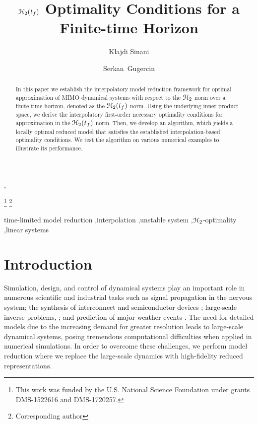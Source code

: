 \documentclass[twocolumn]{autart}
\begin{document}
\begin{frontmatter}
\title{ {$\EuScript{H}_2(t_f)$ Optimality Conditions for a Finite-time Horizon} }
\author{Klajdi Sinani} ,
\author{Serkan~Gugercin} 

\thanks[mytitlenote]{This work was funded by the U.S. National Science Foundation under grants DMS-1522616 and  DMS-1720257.}
\thanks[cor]{Corresponding author }
\address{Department of Mathematics, Virginia Polytechnic Institute and State University, Blacksburg, VA 24061, USA}

\begin{abstract} 
In this paper we establish the interpolatory model reduction framework for optimal approximation of MIMO dynamical systems with respect to the $\EuScript{H}_2$ norm over a finite-time horizon, denoted as the $\EuScript{H}_2(t_f)$ norm.
Using the underlying inner product space, we derive the interpolatory first-order necessary optimality conditions for approximation in the $\EuScript{H}_2(t_f)$ norm. Then,  we  develop an algorithm, which yields a locally optimal reduced model that satisfies the established interpolation-based optimality conditions. We test the algorithm on various numerical examples to illustrate its performance.
\end{abstract}

\begin{keyword}
 time-limited model reduction \sep interpolation \sep unstable system \sep $\EuScript{H}_2$-optimality \sep linear systems 
\end{keyword}

\end{frontmatter}
\section{Introduction}
Simulation, design, and control of dynamical systems play an important role in numerous scientific and industrial tasks such as \textcolor{black}{signal propagation in the nervous system\cite{kellems2009low};  the synthesis  of
interconnect \cite{BonD07} and semiconductor devices \cite{Hess2014}; large-scale inverse problems,
 \cite{Druskin2011solution,Lieberman2010,de2015nonlinear}; and prediction of major weather events \cite{Ant05}.}
The need for  detailed  models due to the increasing demand for greater resolution leads to  
large-scale dynamical systems, posing tremendous computational difficulties when applied in numerical simulations. In order to overcome these challenges, we perform  model reduction where we replace the large-scale dynamics with high-fidelity reduced representations.
\end{document}
